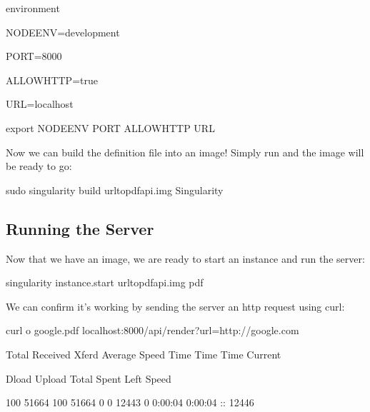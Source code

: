 \documentclass[letterpaper,10pt,english]{sphinxmanual}
\begin{document}
%
\begin{sphinxVerbatim}[commandchars=\\\{\}]
\PYGZpc{}environment

    NODE\PYGZus{}ENV=development

    PORT=8000

    ALLOW\PYGZus{}HTTP=true

    URL=localhost

    export NODE\PYGZus{}ENV PORT ALLOW\PYGZus{}HTTP URL
\end{sphinxVerbatim}

Now we can build the definition file into an image! Simply run  and the
image will be ready to go:

%
\begin{sphinxVerbatim}[commandchars=\\\{\}]
\PYGZdl{} sudo singularity build url\PYGZhy{}to\PYGZhy{}pdf\PYGZhy{}api.img Singularity
\end{sphinxVerbatim}


\subsection{Running the Server}
\label{\detokenize{running_services:running-the-server}}
Now that we have an image, we are ready to start an instance and run the
server:

%
\begin{sphinxVerbatim}[commandchars=\\\{\}]
\PYGZdl{} singularity instance.start url\PYGZhy{}to\PYGZhy{}pdf\PYGZhy{}api.img pdf
\end{sphinxVerbatim}

We can confirm it’s working by sending the server an http request using
curl:

%
\begin{sphinxVerbatim}[commandchars=\\\{\}]
\PYGZdl{} curl \PYGZhy{}o google.pdf localhost:8000/api/render?url=http://google.com

  \PYGZpc{} Total    \PYGZpc{} Received \PYGZpc{} Xferd  Average Speed   Time    Time     Time  Current

                                 Dload  Upload   Total   Spent    Left  Speed

100 51664  100 51664    0     0  12443      0  0:00:04  0:00:04 \PYGZhy{}\PYGZhy{}:\PYGZhy{}\PYGZhy{}:\PYGZhy{}\PYGZhy{} 12446
\end{sphinxVerbatim}
\end{document}
